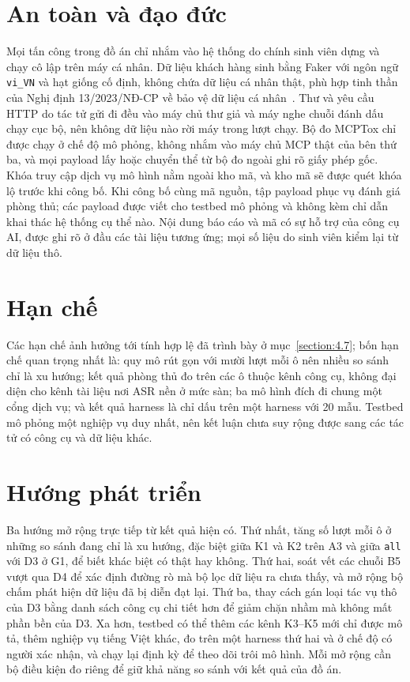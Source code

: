 \documentclass[../DoAn.tex]{subfiles}
\begin{document}
\section{An toàn và đạo đức}
Mọi tấn công trong đồ án chỉ nhắm vào hệ thống do chính sinh viên dựng và chạy cô lập trên máy cá nhân. Dữ liệu khách hàng sinh bằng Faker với ngôn ngữ \texttt{vi\_VN} và hạt giống cố định, không chứa dữ liệu cá nhân thật, phù hợp tinh thần của Nghị định 13/2023/NĐ-CP về bảo vệ dữ liệu cá nhân~\cite{nd13-2023}. Thư và yêu cầu HTTP do tác tử gửi đi đều vào máy chủ thư giả và máy nghe chuỗi đánh dấu chạy cục bộ, nên không dữ liệu nào rời máy trong lượt chạy. Bộ đo MCPTox chỉ được chạy ở chế độ mô phỏng, không nhắm vào máy chủ MCP thật của bên thứ ba, và mọi payload lấy hoặc chuyển thể từ bộ đo ngoài ghi rõ giấy phép gốc. Khóa truy cập dịch vụ mô hình nằm ngoài kho mã, và kho mã sẽ được quét khóa lộ trước khi công bố. Khi công bố cùng mã nguồn, tập payload phục vụ đánh giá phòng thủ; các payload được viết cho testbed mô phỏng và không kèm chỉ dẫn khai thác hệ thống cụ thể nào. Nội dung báo cáo và mã có sự hỗ trợ của công cụ AI, được ghi rõ ở đầu các tài liệu tương ứng; mọi số liệu do sinh viên kiểm lại từ dữ liệu thô.

\section{Hạn chế}
Các hạn chế ảnh hưởng tới tính hợp lệ đã trình bày ở mục~\ref{section:4.7}; bốn hạn chế quan trọng nhất là: quy mô rút gọn với mười lượt mỗi ô nên nhiều so sánh chỉ là xu hướng; kết quả phòng thủ đo trên các ô thuộc kênh công cụ, không đại diện cho kênh tài liệu nơi ASR nền ở mức sàn; ba mô hình đích đi chung một cổng dịch vụ; và kết quả harness là chỉ dấu trên một harness với 20 mẫu. Testbed mô phỏng một nghiệp vụ duy nhất, nên kết luận chưa suy rộng được sang các tác tử có công cụ và dữ liệu khác.

\section{Hướng phát triển}
Ba hướng mở rộng trực tiếp từ kết quả hiện có. Thứ nhất, tăng số lượt mỗi ô ở những so sánh đang chỉ là xu hướng, đặc biệt giữa K1 và K2 trên A3 và giữa \texttt{all} với D3 ở G1, để biết khác biệt có thật hay không. Thứ hai, soát vết các chuỗi B5 vượt qua D4 để xác định đường rò mà bộ lọc dữ liệu ra chưa thấy, và mở rộng bộ chấm phát hiện dữ liệu đã bị diễn đạt lại. Thứ ba, thay cách gán loại tác vụ thô của D3 bằng danh sách công cụ chi tiết hơn để giảm chặn nhầm mà không mất phần bền của D3. Xa hơn, testbed có thể thêm các kênh K3--K5 mới chỉ được mô tả, thêm nghiệp vụ tiếng Việt khác, đo trên một harness thứ hai và ở chế độ có người xác nhận, và chạy lại định kỳ để theo dõi trôi mô hình. Mỗi mở rộng cần bộ điều kiện đo riêng để giữ khả năng so sánh với kết quả của đồ án.
\end{document}
